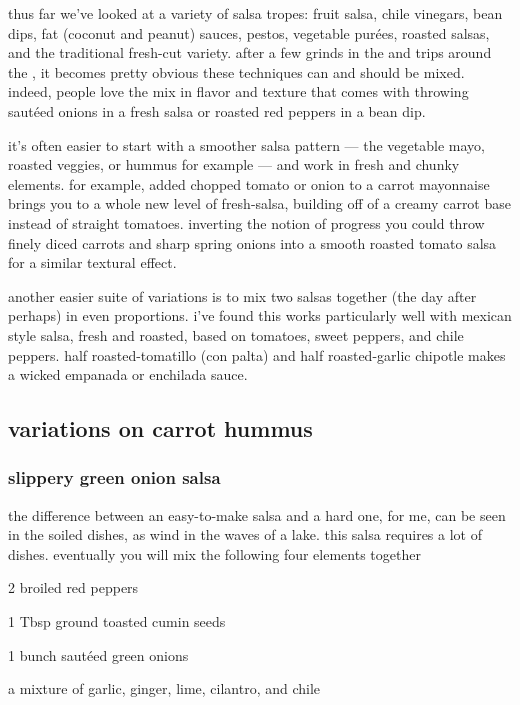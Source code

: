 thus far we've looked at a variety of salsa tropes: fruit salsa, chile
vinegars, bean dips, fat (coconut and peanut) sauces, pestos,
vegetable pur\'{e}es, roasted salsas, and the traditional fresh-cut
variety. after a few grinds in the  and trips around the ,
it becomes pretty obvious these techniques can and should be
mixed. indeed, people love the mix in flavor and texture that comes
with throwing saut\'{e}ed onions in a fresh salsa or roasted red
peppers in a bean dip.

it's often easier to start with a smoother salsa pattern --- the
vegetable mayo, roasted veggies, or hummus for example --- and work in
fresh and chunky elements. for example, added chopped tomato or onion
to a carrot mayonnaise brings you to a whole new level of fresh-salsa,
building off of a creamy carrot base instead of straight
tomatoes. inverting the notion of progress you could throw finely
diced carrots and sharp spring onions into a smooth roasted tomato
salsa for a similar textural effect.

another easier suite of variations is to mix two salsas together (the
day after perhaps) in even proportions. i've found this works
particularly well with mexican style salsa, fresh and roasted, based
on tomatoes, sweet peppers, and chile peppers. half roasted-tomatillo
(con \gls{palta}) and half
roasted-garlic chipotle makes a wicked empanada or enchilada sauce.

\subsection{variations on carrot hummus}

\subsubsection{slippery green onion salsa}

the difference between an easy-to-make salsa and a hard one, for me,
can be seen in the soiled dishes, as wind in the waves of a lake. this
salsa requires a lot of dishes. eventually you will mix the following
four elements together

\begin{ingredients}
  \item 2 broiled red peppers
  \item 1 Tbsp ground toasted cumin seeds
  \item 1 bunch saut\'{e}ed green onions
  \item a mixture of garlic, ginger, lime, cilantro, and chile
\end{ingredients}

